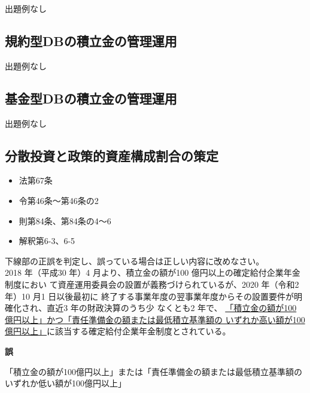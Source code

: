 出題例なし

\newpage

\subsection{規約型DBの積立金の管理運用}

出題例なし

\newpage

\subsection{基金型DBの積立金の管理運用}

出題例なし

\newpage

\subsection{分散投資と政策的資産構成割合の策定}


\begin{InyouJobunbox}
  \begin{itemize}
    \item 法第67条
    \item 令第46条〜第46条の2
    \item 則第84条、第84条の4〜6
    \item 解釈第6-3、6-5
  \end{itemize}
\end{InyouJobunbox}

\begin{truefalse}[年金1 2021 問題1(3)\textcircled{1}]
  下線部の正誤を判定し、誤っている場合は正しい内容に改めなさい。
\\

  2018 年（平成30 年）4 月より、積立金の額が100 億円以上の確定給付企業年金制度におい
て資産運用委員会の設置が義務づけられているが、2020 年（令和2 年）10 月1 日以後最初に
終了する事業年度の翌事業年度からその設置要件が明確化され、直近3 年の財政決算のうち少
なくとも2 年で、 \underline{「積立金の額が100 億円以上」かつ「責任準備金の額または最低積立基準額の
いずれか高い額が100 億円以上」}に該当する確定給付企業年金制度とされている。
\end{truefalse}

\begin{answerbox}
  \textbf{誤}

  「積立金の額が100億円以上」または「責任準備金の額または最低積立基準額のいずれか低い額が100億円以上」
\end{answerbox}

